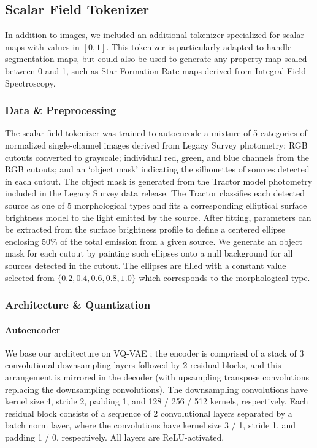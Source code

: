 \documentclass[]{polymathic}
\begin{document}
\subsection{Scalar Field Tokenizer}

In addition to images, we included an additional tokenizer specialized for scalar maps with values in $[0,1]$. This tokenizer is particularly adapted to handle segmentation maps, but could also be used to generate any property map scaled between 0 and 1, such as Star Formation Rate maps derived from Integral Field Spectroscopy. 

\subsubsection{Data \& Preprocessing}

The scalar field tokenizer was trained to autoencode a mixture of 5 categories of normalized single-channel images derived from Legacy Survey photometry: RGB cutouts converted to grayscale; individual red, green, and blue channels from the RGB cutouts; and an `object mask' indicating the silhouettes of sources detected in each cutout. The object mask is generated from the Tractor model photometry included in the Legacy Survey data release. The Tractor classifies each detected source as one of 5 morphological types and fits a corresponding elliptical surface brightness model to the light emitted by the source. After fitting, parameters can be extracted from the surface brightness profile to define a centered ellipse enclosing 50\% of the total emission from a given source. We generate an object mask for each cutout by painting such ellipses onto a null background for all sources detected in the cutout. The ellipses are filled with a constant value selected from $\{0.2, 0.4, 0.6, 0.8, 1.0\}$ which corresponds to the morphological type.

\subsubsection{Architecture \& Quantization}

\paragraph{Autoencoder} We base our architecture on VQ-VAE \citep{vq-vae}; the encoder is comprised of a stack of 3 convolutional downsampling layers followed by 2 residual blocks, and this arrangement is mirrored in the decoder (with upsampling transpose convolutions replacing the downsampling convolutions). The downsampling convolutions have kernel size 4, stride 2, padding 1, and 128 / 256 / 512 kernels, respectively. Each residual block consists of a sequence of 2 convolutional layers separated by a batch norm layer, where the convolutions have kernel size 3 / 1, stride 1, and padding 1 / 0, respectively. All layers are ReLU-activated.
\end{document}
